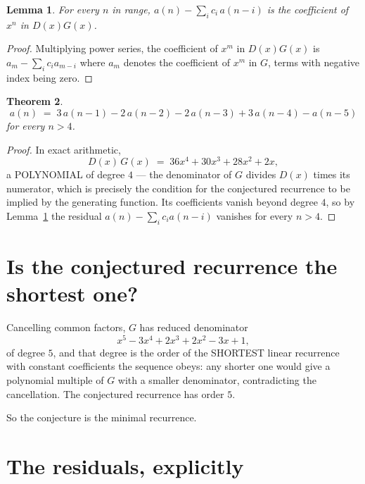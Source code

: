 \documentclass[11pt,a4paper]{article}
\theoremstyle{plain}
\newtheorem{theorem}{Theorem}
\newtheorem{lemma}[theorem]{Lemma}
\theoremstyle{definition}
\begin{document}
\begin{lemma}\label{lem:key}
For every $n$ in range, $a(n)-\sum_i c_i\,a(n-i)$ is the coefficient of $x^{n}$ in
$D(x)G(x)$.
\end{lemma}

\begin{proof}
Multiplying power series, the coefficient of $x^{m}$ in $D(x)G(x)$ is
$a_m-\sum_i c_i a_{m-i}$ where $a_m$ denotes the coefficient of $x^{m}$ in $G$, terms with
negative index being zero.
\end{proof}

\begin{theorem}
\[
a(n)\;=\;3\,a(n-1) - 2\,a(n-2) - 2\,a(n-3) + 3\,a(n-4) - a(n-5)
\]
for every $n>4$.
\end{theorem}

\begin{proof}
In exact arithmetic,
\[
D(x)\,G(x)\;=\;36 x^{4} + 30 x^{3} + 28 x^{2} + 2 x,
\]
a POLYNOMIAL of degree $4$ --- the denominator of $G$ divides $D(x)$ times its numerator,
which is precisely the condition for the conjectured recurrence to be implied by the
generating function. Its coefficients vanish beyond degree $4$, so by
Lemma~\ref{lem:key} the residual $a(n)-\sum_ic_ia(n-i)$ vanishes for every
$n>4$.
\end{proof}

\section{Is the conjectured recurrence the shortest one?}

Cancelling common factors, $G$ has reduced denominator
\[
x^{5} - 3 x^{4} + 2 x^{3} + 2 x^{2} - 3 x + 1,
\]
of degree $5$, and that degree is the order of the SHORTEST linear recurrence with
constant coefficients the sequence obeys: any shorter one would give a polynomial multiple of
$G$ with a smaller denominator, contradicting the cancellation. The conjectured recurrence has
order $5$.

So the conjecture is the minimal recurrence.

\section{The residuals, explicitly}
\end{document}
